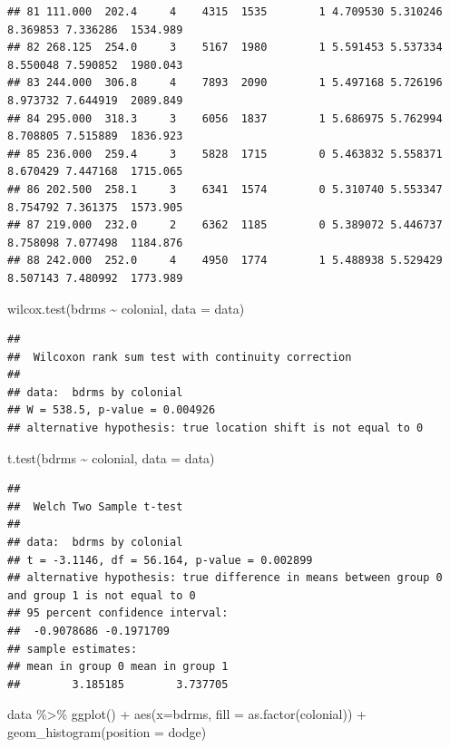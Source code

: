 \documentclass[
]{book}
\newenvironment{Shaded}{\begin{snugshade}}{\end{snugshade}}
\newcommand{\AttributeTok}[1]{\textcolor[rgb]{0.77,0.63,0.00}{#1}}
\newcommand{\FunctionTok}[1]{\textcolor[rgb]{0.00,0.00,0.00}{#1}}
\newcommand{\NormalTok}[1]{#1}
\newcommand{\SpecialCharTok}[1]{\textcolor[rgb]{0.00,0.00,0.00}{#1}}
\newcommand{\StringTok}[1]{\textcolor[rgb]{0.31,0.60,0.02}{#1}}
\theoremstyle{definition}
\theoremstyle{definition}
\theoremstyle{definition}
\theoremstyle{definition}
\theoremstyle{remark}
\begin{document}
\begin{verbatim}
## 81 111.000  202.4     4    4315  1535        1 4.709530 5.310246  8.369853 7.336286  1534.989
## 82 268.125  254.0     3    5167  1980        1 5.591453 5.537334  8.550048 7.590852  1980.043
## 83 244.000  306.8     4    7893  2090        1 5.497168 5.726196  8.973732 7.644919  2089.849
## 84 295.000  318.3     3    6056  1837        1 5.686975 5.762994  8.708805 7.515889  1836.923
## 85 236.000  259.4     3    5828  1715        0 5.463832 5.558371  8.670429 7.447168  1715.065
## 86 202.500  258.1     3    6341  1574        0 5.310740 5.553347  8.754792 7.361375  1573.905
## 87 219.000  232.0     2    6362  1185        0 5.389072 5.446737  8.758098 7.077498  1184.876
## 88 242.000  252.0     4    4950  1774        1 5.488938 5.529429  8.507143 7.480992  1773.989
\end{verbatim}

\begin{Shaded}
\begin{Highlighting}[]
\FunctionTok{wilcox.test}\NormalTok{(bdrms }\SpecialCharTok{\textasciitilde{}}\NormalTok{ colonial, }\AttributeTok{data =}\NormalTok{ data)}
\end{Highlighting}
\end{Shaded}

\begin{verbatim}
## 
##  Wilcoxon rank sum test with continuity correction
## 
## data:  bdrms by colonial
## W = 538.5, p-value = 0.004926
## alternative hypothesis: true location shift is not equal to 0
\end{verbatim}

\begin{Shaded}
\begin{Highlighting}[]
\FunctionTok{t.test}\NormalTok{(bdrms }\SpecialCharTok{\textasciitilde{}}\NormalTok{ colonial, }\AttributeTok{data =}\NormalTok{ data)}
\end{Highlighting}
\end{Shaded}

\begin{verbatim}
## 
##  Welch Two Sample t-test
## 
## data:  bdrms by colonial
## t = -3.1146, df = 56.164, p-value = 0.002899
## alternative hypothesis: true difference in means between group 0 and group 1 is not equal to 0
## 95 percent confidence interval:
##  -0.9078686 -0.1971709
## sample estimates:
## mean in group 0 mean in group 1 
##        3.185185        3.737705
\end{verbatim}

\begin{Shaded}
\begin{Highlighting}[]
\NormalTok{data }\SpecialCharTok{\%\textgreater{}\%} 
  \FunctionTok{ggplot}\NormalTok{() }\SpecialCharTok{+} 
  \FunctionTok{aes}\NormalTok{(}\AttributeTok{x=}\NormalTok{bdrms, }\AttributeTok{fill =} \FunctionTok{as.factor}\NormalTok{(colonial)) }\SpecialCharTok{+} 
  \FunctionTok{geom\_histogram}\NormalTok{(}\AttributeTok{position =} \StringTok{\textquotesingle{}dodge\textquotesingle{}}\NormalTok{)}
\end{Highlighting}
\end{Shaded}
\end{document}
